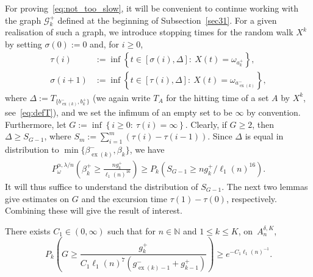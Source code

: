 \documentclass[AHL,Unicode,longabstracts,published]{cedram}
\newcommand{\N}{\mathbb N}
\newcommand{\clG}{\mathcal{G}}
\newcommand{\Pk}{{P_k}}
\newcommand\ex{\operatorname{ex}}
\newcommand{\aat}[1]{a_{\ex(#1)}^-}
\newcommand{\bt}[1]{b_{\ex(#1)}^-}
\newcommand{\gtt}[1]{g_{\ex(#1)-1}^-}
\newcommand{\betat}[1]{\beta^-_{\ex(#1)}}
\begin{document}
For proving~\eqref{eq:not_too_slow}, it will be convenient to continue working with the graph $\clG_k^+$ defined at the beginning of Subsection~\ref{sec31}. For a given realisation of such a graph, we introduce stopping times for the random walk $X^k$ by setting $\sigma(0):=0$ and, for $i\geq 0$,
\begin{align*}
\tau(i)&:=\inf\left\{t\in[\sigma(i),\Delta]:\:X(t)= \omega_{a_k^+}\right\},\\
\sigma(i+1)&:=\inf\left\{t\in [\tau(i),\Delta]:\:X(t)=\omega_{\aat{k}}\right\},
\end{align*}
where $\Delta:=T_{\{\bt{k},b_k^+\}}$ (we again write $T_A$ for the hitting time of a set $A$ by $X^k$, see~\eqref{eq:defT}), and we set the infimum of an empty set to be $\infty$ by convention. Furthermore, let $G:=\inf\left\{i\geq 0:\:\tau(i)=\infty\right\}$. Clearly, if $G\geq 2$, then $\Delta\geq S_{G-1}$, where $S_m:=\sum_{i=1}^{m}(\tau(i)-\tau(i-1))$. Since $\Delta$ is equal in distribution to $\min\{\betat{k},\beta_k\}$, we have
\begin{align}\label{eq:betatoS}
P_\omega^{\alpha,\lambda/n}\left(\beta_k^+\geq \frac{ng_k^+}{\ell_1(n)^{16}}\right)
\geq \Pk\left(S_{G-1}\geq ng_k^+/\ell_1(n)^{16}\right).
\end{align}
It will thus suffice to understand the distribution of $S_{G-1}$. The next two lemmas give estimates on $G$ and the excursion time $\tau(1)-\tau(0)$, respectively. Combining these will give the result of interest.

\begin{lemm}\label{lem:geom}
There exists $C_1\in (0,\infty)$ such that for $n\in\N$ and $1\leq k\leq K$, on~$A_n^{\delta,K}$,
\[
\Pk\left(G\geq \frac{ g_{k}^+}{C_1 \ell_1(n)^7\left(\gtt{k}+g_{k-1}^+\right)}\right)\geq e^{-C_1\ell_1(n)^{-1}}.
\]
\end{lemm}
\end{document}
